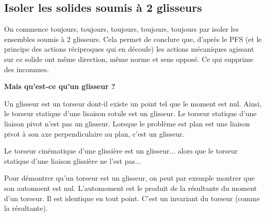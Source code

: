 \subsection{Isoler les solides soumis à 2 glisseurs}

On commence toujours, \large{toujours}, \Large{toujours}, \LARGE{toujours}, \huge{toujours} \normalsize par isoler les ensembles soumis à 2 glisseurs. Cela permet de conclure que, d'après le PFS (et le principe des actions réciproques qui en découle) les actions mécaniques agissant sur ce solide ont même direction, même norme et sens opposé. Ce qui supprime des inconnues.

\textbf{Mais qu'est-ce qu'un glisseur ?}

Un glisseur est un torseur dont-il existe un point tel que le moment est nul. Ainsi, le torseur statique d'une lisaison rotule est un glisseur. Le torseur statique d'une liaison pivot n'est pas un glisseur. Lorsque le problème est plan est une liaison pivot à son axe perpendiculaire au plan, c'est un glisseur. 

Le torseur cinématique d'une glissière est un glisseur... alors que le torseur statique d'une liaison glissière ne l'est pas... 

\begin{rem}
Pour démontrer qu'un torseur est un glisseur, on peut par exemple montrer que son automoent est nul. L'automoment est le produit de la résultante du moment d'un torseur. Il est identique en tout point. C'est un invariant du torseur (comme la résultante).
\end{rem}

